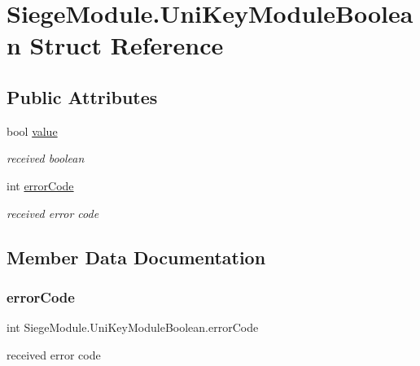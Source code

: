 \hypertarget{struct_siege_module_1_1_uni_key_module_boolean}{}\section{Siege\+Module.\+Uni\+Key\+Module\+Boolean Struct Reference}
\label{struct_siege_module_1_1_uni_key_module_boolean}
\subsection*{Public Attributes}
\begin{DoxyCompactItemize}
\item 
bool \mbox{\hyperlink{struct_siege_module_1_1_uni_key_module_boolean_aeaf91918c514973225ad65bec8df4ac5}{value}}
\begin{DoxyCompactList}\small\item\em received boolean \end{DoxyCompactList}\item 
int \mbox{\hyperlink{struct_siege_module_1_1_uni_key_module_boolean_abbf053c46dcb1393a328bdd6049ab64c}{error\+Code}}
\begin{DoxyCompactList}\small\item\em received error code \end{DoxyCompactList}\end{DoxyCompactItemize}


\subsection{Member Data Documentation}
\mbox{\label{struct_siege_module_1_1_uni_key_module_boolean_abbf053c46dcb1393a328bdd6049ab64c}} 
\subsubsection{\texorpdfstring{error\+Code}{errorCode}}
{\footnotesize\ttfamily int Siege\+Module.\+Uni\+Key\+Module\+Boolean.\+error\+Code}



received error code 


